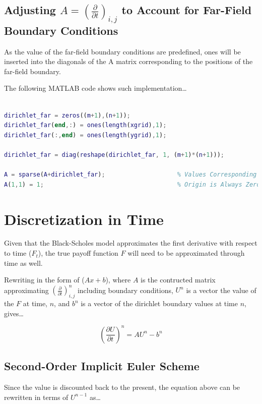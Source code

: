 \documentclass[12pt,letterpaper]{article}
\begin{document}
\subsection*{Adjusting $A = \left(\frac{\partial}{\partial t}\right)_{i,j}$ to Account for Far-Field Boundary Conditions}

As the value of the far-field boundary conditions are predefined, ones will be inserted into the diagonals of the A matrix corresponding to the positions of the far-field boundary.

The following MATLAB code shows such implementation\ldots

\begin{lstlisting}[language = Matlab]
%% Updating A to Account for Far-Field Dirichlet Boundary Conditions

dirichlet_far = zeros((m+1),(n+1));
dirichlet_far(end,:) = ones(length(xgrid),1);
dirichlet_far(:,end) = ones(length(ygrid),1);

dirichlet_far = diag(reshape(dirichlet_far, 1, (m+1)*(n+1)));

A = sparse(A+dirichlet_far);                    % Values Corresponding to Far-Field Boundary in A Are One on Diagonal
A(1,1) = 1;                                     % Origin is Always Zero
\end{lstlisting}

\newpage

\section*{Discretization in Time}

Given that the Black-Scholes model approximates the first derivative with respect to time ($F_t$), the true payoff function $F$ will need to be approximated through time as well.

Rewriting in the form of ($Ax+b$), where $A$ is the contructed matrix approximating $\left(\frac{\partial}{\partial t}\right)_{i,j}^n$ including boundary conditions, $U^n$ is a vector the value of the $F$ at time, $n$, and $b^n$ is a vector of the dirichlet boundary values at time $n$, gives\ldots

\begin{equation*}
    \left(\frac{\partial U}{\partial t}\right)^n = AU^n - b^n
\end{equation*}

\subsection*{Second-Order Implicit Euler Scheme}
Since the value is discounted back to the present, the equation above can be rewritten in terms of $U^{n-1}$ as\ldots
\end{document}
